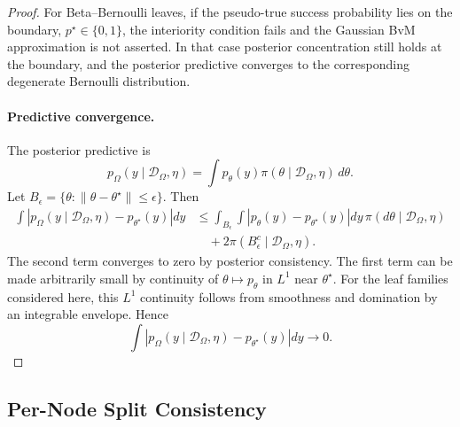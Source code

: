 \begin{proof}
For Beta--Bernoulli leaves, if the pseudo-true success probability lies on the boundary, $p^\star\in\{0,1\}$, the interiority condition fails and the Gaussian BvM approximation is not asserted. In that case posterior concentration still holds at the boundary, and the posterior predictive converges to the corresponding degenerate Bernoulli distribution.

\paragraph{Predictive convergence.}
The posterior predictive is
\[
p_\Omega(y\mid\mathcal{D}_\Omega,\eta)
=
\int p_\theta(y)
\pi(\theta\mid\mathcal{D}_\Omega,\eta)
\,d\theta.
\]
Let $B_\epsilon=\{\theta:\|\theta-\theta^\star\|\le\epsilon\}$.
Then
\[
\begin{aligned}
\int
\left|
p_\Omega(y\mid\mathcal{D}_\Omega,\eta)
-
p_{\theta^\star}(y)
\right|dy
&\le
\int_{B_\epsilon}
\int
|p_\theta(y)-p_{\theta^\star}(y)|dy
\,\pi(d\theta\mid\mathcal{D}_\Omega,\eta) \\
&\quad
+
2\pi(B_\epsilon^c\mid\mathcal{D}_\Omega,\eta).
\end{aligned}
\]
The second term converges to zero by posterior consistency.
The first term can be made arbitrarily small by continuity of $\theta\mapsto p_\theta$ in $L^1$ near $\theta^\star$.
For the leaf families considered here, this $L^1$ continuity follows from smoothness and domination by an integrable envelope. Hence
\[
\int
\left|
p_\Omega(y\mid\mathcal{D}_\Omega,\eta)
-
p_{\theta^\star}(y)
\right|dy
\to 0.
\]
\end{proof}


\subsection{Per-Node Split Consistency}
\label{app:split_consistency}

